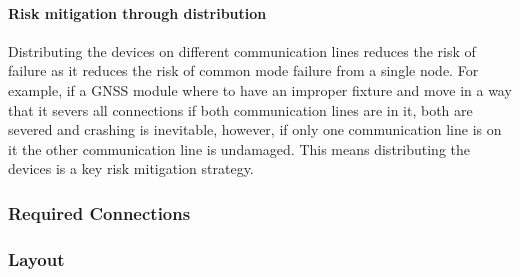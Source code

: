 \paragraph{Risk mitigation through distribution}
Distributing the devices on different communication lines reduces the risk of failure as it reduces the risk of common mode failure from a single node. For example, if a GNSS module where to have an improper fixture and move in a way that it severs all connections if both communication lines are in it, both are severed and crashing is inevitable, however, if only one communication line is on it the other communication line is undamaged. This means distributing the devices is a key risk mitigation strategy.

\subsubsection{Required Connections}
\subsubsection{Layout}

